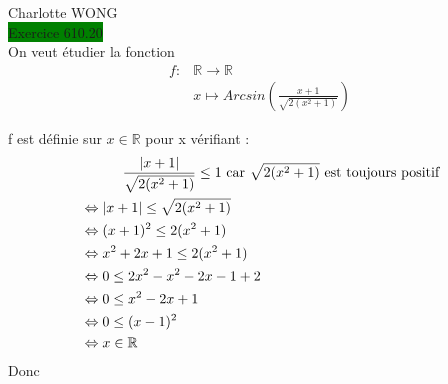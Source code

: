 \documentclass{article}
\begin{document}
\noindent \Large
Charlotte WONG\\

\noindent
\colorbox{green}{Exercice 610.20}\\

\large \noindent
On veut étudier la fonction 
\begin{align*}
    f : &\mathbb{R} \rightarrow \mathbb{R}\\
    &x \mapsto Arcsin(\frac{x+1}{\sqrt{2(x^2+1)}})
\end{align*}

\noindent
f est définie sur \(x \in \mathbb{R}\) pour x vérifiant :
\begin{align*}
    &\indent \indent \frac{|x + 1|}{\sqrt{2(x^2+1)}} \leq 1 \text{ car \(\sqrt{2(x^2+1)}\) est toujours positif}\\
    & \Leftrightarrow |x+1| \leq \sqrt{2(x^2+1)}\\
    & \Leftrightarrow (x+1)^2 \leq 2(x^2+1)\\
    & \Leftrightarrow x^2 + 2x + 1 \leq 2(x^2+1)\\
    & \Leftrightarrow 0 \leq 2x^2 - x^2 - 2x -1 + 2\\
    & \Leftrightarrow 0 \leq x^2 - 2x + 1 \\
    & \Leftrightarrow 0 \leq (x-1)^2\\
    & \Leftrightarrow x \in \mathbb{R}
\end{align*}
\noindent
Donc \\
\end{document}

